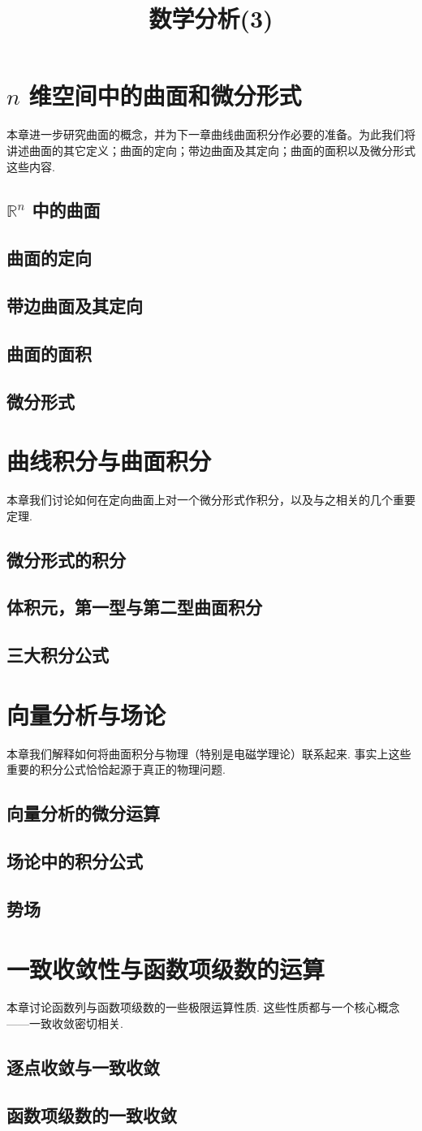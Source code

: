 \documentclass{ctexrep}
\title{数学分析(3)}
\theoremstyle{examplestyle}
\theoremstyle{hintstyle}
\newcommand{\mychapter}[1]{{\color{mydarkblue}\chapter{#1}}}
\newcommand{\mysection}[1]{{\color{mydarkblue}\section{#1}}}
\newcommand{\RR}{\mathbb{R}}
\begin{document}
\maketitle
\tableofcontents

\setcounter{chapter}{11}
\mychapter{$n$ 维空间中的曲面和微分形式}

本章进一步研究曲面的概念，并为下一章曲线曲面积分作必要的准备。为此我们将讲述曲面的其它定义；曲面的定向；带边曲面及其定向；曲面的面积以及微分形式这些内容.

\mysection{$\RR^n$ 中的曲面}



\mysection{曲面的定向}



\mysection{带边曲面及其定向}



\mysection{曲面的面积}



\mysection{微分形式}



\mychapter{曲线积分与曲面积分}

本章我们讨论如何在定向曲面上对一个微分形式作积分，以及与之相关的几个重要定理.

\mysection{微分形式的积分}



\mysection{体积元，第一型与第二型曲面积分}



\mysection{三大积分公式}



\mychapter{向量分析与场论}

本章我们解释如何将曲面积分与物理（特别是电磁学理论）联系起来. 事实上这些重要的积分公式恰恰起源于真正的物理问题.

\mysection{向量分析的微分运算}



\mysection{场论中的积分公式}



\mysection{势场}



\setcounter{chapter}{15}
\mychapter{一致收敛性与函数项级数的运算}

本章讨论函数列与函数项级数的一些极限运算性质. 这些性质都与一个核心概念——一致收敛密切相关.

\mysection{逐点收敛与一致收敛}



\mysection{函数项级数的一致收敛}


\end{document}
